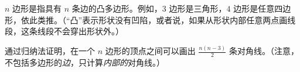 \begin{exercise}
    $n$ 边形是指具有 $n$ 条边的凸多边形。例如，$3$ 边形是三角形，$4$ 边形是任意四边形，依此类推。（``凸''表示形状没有凹陷，或者说，如果从形状内部任意两点画线段，这条线段不会穿出形状外。）

    通过归纳法证明，在一个 $n$ 边形的顶点之间可以画出 $\frac{n(n-3)}{2}$ 条对角线。（注意，不包括多边形的\emph{边}，只计算\emph{内部的}对角线。）
\end{exercise}